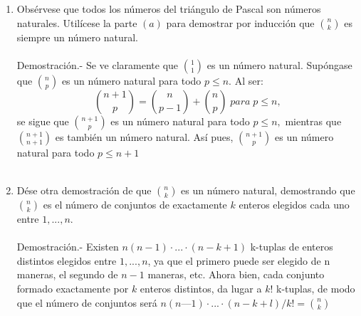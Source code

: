 \begin{enumerate}[\bfseries 1.]
\begin{enumerate}[\bfseries (a)]
          \item Obsérvese que todos los números del triángulo de Pascal son números naturales. Utilícese la parte $(a)$ para demostrar por inducción que $ {n \choose k}$ es siempre un número natural.\\\\
          Demostración.- \; Se ve claramente que ${1 \choose 1}$ es un número natural. Supóngase que ${n \choose p}$ es un número natural para todo $p \leq n$. Al ser: $${ n+1 \choose p } = {n \choose p-1} + {n \choose p} \; para \; p \leq n,$$ se sigue que ${n+1 \choose p}$ es un número natural para todo $p \leq n,$ mientras que ${n+1 \choose n+1}$ es también un número natural. Así pues, ${n+1 \choose p}$ es un número natural para todo $p \leq n+1$\\\\

          \item Dése otra demostración de que ${n \choose k}$ es un número natural, demostrando que ${n \choose k}$ es el número de conjuntos de exactamente $k$ enteros elegidos cada uno entre $1,...,n$.\\\\
          Demostración.- \; Existen $n(n -1) \cdot ... \cdot (n - k + 1)$ k-tuplas de enteros distintos elegidos entre $1, ..., n$, ya que el primero puede ser elegido de n maneras, el segundo de $n - 1$ maneras, etc. Ahora bien, cada conjunto formado exactamente por $k$ enteros distintos, da lugar a $k!$ k-tuplas, de
          modo que el número de conjuntos será $n(n — 1) \cdot ... \cdot (n - k + l)/k! = {n\choose k}$\\\\ 


\end{enumerate}
\end{enumerate}
